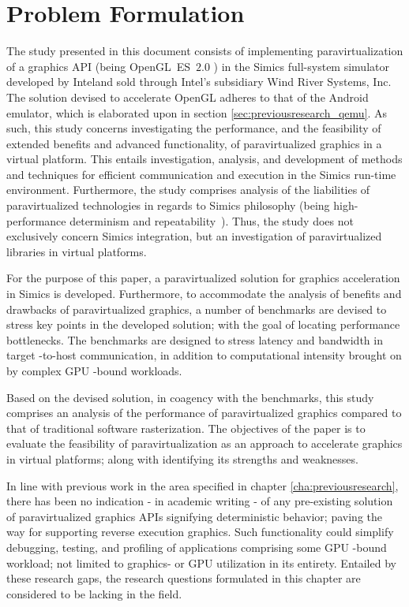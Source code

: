 
\section{Problem Formulation}
\label{sec:problemformulation}
The study presented in this document consists of implementing paravirtualization of a graphics API (being OpenGL~ES~$2.0$ ) in the Simics full-system simulator developed by Intel\circledR and sold through Intel\circledR 's subsidiary Wind River Systems, Inc. 
The solution devised to accelerate OpenGL adheres to that of the Android emulator, which is elaborated upon in section \ref{sec:previousresearch_qemu}.
As such, this study concerns investigating the performance, and the feasibility of extended benefits and advanced functionality, of paravirtualized graphics in a virtual platform.
This entails investigation, analysis, and development of methods and techniques for efficient communication and execution in the Simics run-time environment.
Furthermore, the study comprises analysis of the liabilities of paravirtualized technologies in regards to Simics philosophy (being high-performance determinism and repeatability~).
Thus, the study does not exclusively concern Simics integration, but an investigation of paravirtualized libraries in virtual platforms.

For the purpose of this paper, a paravirtualized solution for graphics acceleration in Simics is developed.
Furthermore, to accommodate the analysis of benefits and drawbacks of paravirtualized graphics, a number of benchmarks are devised to stress key points in the developed solution; with the goal of locating performance bottlenecks.
The benchmarks are designed to stress latency and bandwidth in target -to-host communication, in addition to computational intensity brought on by complex GPU -bound workloads.

Based on the devised solution, in coagency with the benchmarks, this study comprises an analysis of the performance of paravirtualized graphics compared to that of traditional software rasterization.
The objectives of the paper is to evaluate the feasibility of paravirtualization as an approach to accelerate graphics in virtual platforms; along with identifying its strengths and weaknesses.

In line with previous work in the area specified in chapter \ref{cha:previousresearch}, there has been no indication - in academic writing - of any pre-existing solution of paravirtualized graphics APIs signifying deterministic behavior; paving the way for supporting reverse execution graphics.
Such functionality could simplify debugging, testing, and profiling of applications comprising some GPU -bound workload; not limited to graphics- or GPU utilization in its entirety.
Entailed by these research gaps, the research questions formulated in this chapter are considered to be lacking in the field.

